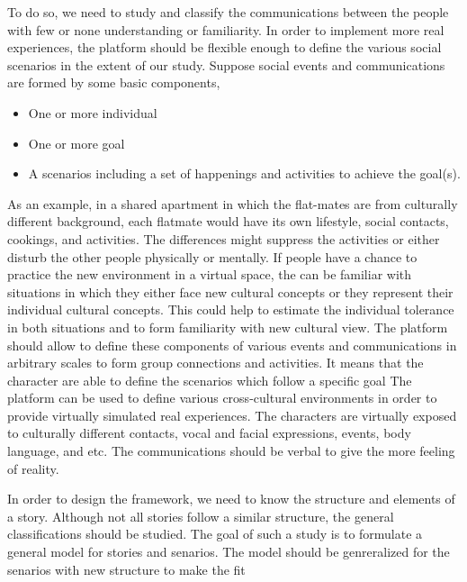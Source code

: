 \documentclass[conference]{IEEEtran}
\begin{document}
To do so, we need to study and classify the 
communications between the people with few or none understanding or familiarity. In order to implement 
more real experiences, the platform should be flexible enough to define the various social scenarios in the extent of our study.
Suppose social events and communications are formed by some basic components,
\begin{itemize}
\item One or more individual
\item One or more goal
\item A scenarios including a set of happenings and activities to achieve the goal(s).
\end{itemize}
As an example, in a shared apartment in which the flat-mates are from culturally different background, each flatmate would have its own lifestyle, social contacts, cookings, and activities. The differences might suppress the activities or either disturb the other people physically or mentally. If people have a chance to practice the new environment in a virtual space, the can be familiar with situations in which they either face new cultural concepts or they represent their individual cultural concepts. This could help to estimate the individual tolerance in both situations and to form familiarity with new cultural view. 
The platform should allow to define these components of various events and communications in 
arbitrary scales to form group connections and activities. It means that the character are able to define the scenarios which follow a specific goal
The platform can be used to define various cross-cultural environments in order to
provide virtually simulated real experiences. The characters are virtually exposed to culturally
different contacts, vocal and facial expressions, events, body language, and etc.
The communications should be verbal to give the more feeling of reality. 


In order to design the framework, we need to know the structure and 
elements of a story. Although not all stories follow a similar structure,
the general classifications should be studied. The goal of such a study is to 
formulate a general model for stories and senarios. The model should be genreralized
for the senarios with new structure to make the fit  
\end{document}

